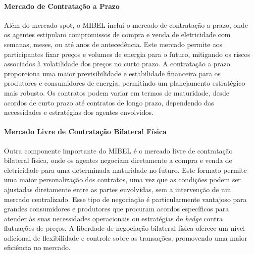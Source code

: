 \paragraph{Mercado de Contratação a Prazo \label{se:mercado_prazo}}
\text{ }  \par
Além do mercado spot, o \gls{MIBEL} inclui o mercado de contratação a prazo, onde os agentes estipulam compromissos de compra e venda de eletricidade com semanas, meses, ou até anos de antecedência. Este mercado permite aos participantes fixar preços e volumes de energia para o futuro, mitigando os riscos associados à volatilidade dos preços no curto prazo. A contratação a prazo proporciona uma maior previsibilidade e estabilidade financeira para os produtores e consumidores de energia, permitindo um planejamento estratégico mais robusto. Os contratos podem variar em termos de maturidade, desde acordos de curto prazo até contratos de longo prazo, dependendo das necessidades e estratégias dos agentes envolvidos.\par


\paragraph{Mercado Livre de Contratação Bilateral Física \label{se:mercado_bilateral}}
\text{ }  \par
Outra componente importante do \gls{MIBEL} é o mercado livre de contratação bilateral física, onde os agentes negociam diretamente a compra e venda de eletricidade para uma determinada maturidade no futuro. Este formato permite uma maior personalização dos contratos, uma vez que as condições podem ser ajustadas diretamente entre as partes envolvidas, sem a intervenção de um mercado centralizado. Esse tipo de negociação é particularmente vantajoso para grandes consumidores e produtores que procuram acordos específicos para atender às suas necessidades operacionais ou estratégias de \textit{hedge} contra flutuações de preços. A liberdade de negociação bilateral física oferece um nível adicional de flexibilidade e controle sobre as transações, promovendo uma maior eficiência no mercado.\par

